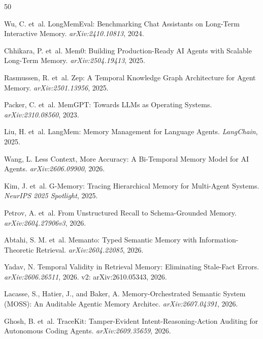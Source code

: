 \documentclass[11pt]{article}
\begin{document}
\begin{thebibliography}{50}

Wu, C. et~al.
\newblock LongMemEval: Benchmarking Chat Assistants on Long-Term Interactive Memory. \newblock \emph{arXiv:2410.10813}, 2024.

Chhikara, P. et~al.
\newblock Mem0: Building Production-Ready AI Agents with Scalable Long-Term Memory.
\newblock \emph{arXiv:2504.19413}, 2025.

Rasmussen, R. et~al.
\newblock Zep: A Temporal Knowledge Graph Architecture for Agent Memory.
\newblock \emph{arXiv:2501.13956}, 2025.

Packer, C. et~al.
\newblock MemGPT: Towards LLMs as Operating Systems.
\newblock \emph{arXiv:2310.08560}, 2023.

Liu, H. et~al.
\newblock LangMem: Memory Management for Language Agents.
\newblock \emph{LangChain}, 2025.

Wang, L.
\newblock Less Context, More Accuracy: A Bi-Temporal Memory Model for AI Agents.
\newblock \emph{arXiv:2606.09900}, 2026.

Kim, J. et~al.
\newblock G-Memory: Tracing Hierarchical Memory for Multi-Agent Systems.
\newblock \emph{NeurIPS 2025 Spotlight}, 2025.

Petrov, A. et~al.
\newblock From Unstructured Recall to Schema-Grounded Memory.
\newblock \emph{arXiv:2604.27906v3}, 2026.

Abtahi, S. M. et~al.
\newblock Memanto: Typed Semantic Memory with Information-Theoretic Retrieval.
\newblock \emph{arXiv:2604.22085}, 2026.

Yadav, N.
\newblock Temporal Validity in Retrieval Memory: Eliminating Stale-Fact Errors.
\newblock \emph{arXiv:2606.26511}, 2026. v2: arXiv:2610.05343, 2026.

Lacasse, S., Hatier, J., and Baker, A.
\newblock Memory-Orchestrated Semantic System (MOSS): An Auditable Agentic Memory Architec. \newblock \emph{arXiv:2607.04391}, 2026.

Ghosh, B. et~al.
\newblock TraceKit: Tamper-Evident Intent-Reasoning-Action Auditing for Autonomous Coding Agents.
\newblock \emph{arXiv:2609.35659}, 2026.


\end{thebibliography}
\end{document}
